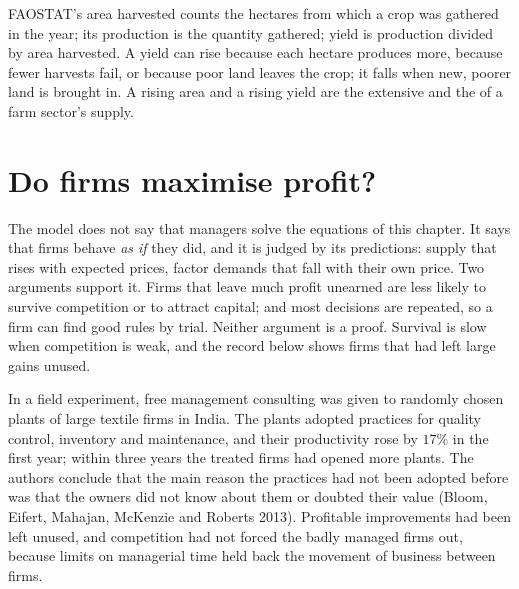 \begin{measure}
FAOSTAT's area harvested counts the hectares from which a crop was
gathered in the year; its production is the quantity gathered; yield is
production divided by area harvested. A yield can rise because each
hectare produces more, because fewer harvests fail, or because poor land
leaves the crop; it falls when new, poorer land is brought in. A rising
area and a rising yield are the extensive and the  of a
farm sector's supply.
\end{measure}

\section{Do firms maximise profit?}\label{sec:b1:profit-maximisation:evidence}

The model does not say that managers solve the equations of this chapter.
It says that firms behave \emph{as if} they did, and it is judged by its
predictions: supply that rises with expected prices, factor demands that
fall with their own price. Two arguments support it. Firms that leave
much profit unearned are less likely to survive competition or to attract
capital; and most decisions are repeated, so a firm can find good rules by
trial. Neither argument is a proof. Survival is slow when competition is
weak, and the record below shows firms that had left large gains unused.

\begin{record}
In a field experiment, free management consulting was given to randomly
chosen plants of large textile firms in India. The plants adopted
practices for quality control, inventory and maintenance, and their
productivity rose by $17\%$ in the first year; within three years the
treated firms had opened more plants. The authors conclude that the main
reason the practices had not been adopted before was that the owners did
not know about them or doubted their value (Bloom, Eifert, Mahajan, McKenzie
and Roberts 2013). %
Profitable improvements had been left unused, and competition had not
forced the badly managed firms out, because limits on managerial time
held back the movement of business between firms. %
\end{record}

